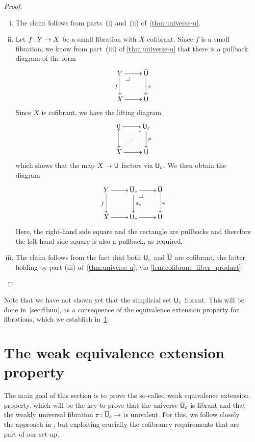 \documentclass[reqno,10pt,a4paper,oneside,draft]{amsart}
\begin{document}
\begin{proof} \hfill
\begin{enumerate}[(i)] 
\item The claim follows from parts~(i) and~(ii) of~\cref{thm:universe-u}. 
\item Let $f \colon Y \to X$ be a small fibration with $X$ cofibrant. Since $f$ is a
small fibration, we know 
from part~(iii) of \cref{thm:universe-u} that there is a pullback diagram of the form 
\[
\xymatrix{
Y \ar[r] \ar[d]_f \drpullback & \UU \ar[d]^{\pi} \\
X \ar[r] & \U }
\]
Since $X$ is cofibrant, we have the lifting diagram
\[
\xymatrix{
0 \ar[r] \ar@{>->}[d] & \U_c \ar[d]^{p} \\
X \ar[r] \ar@{.>}[ur] & \U }
\]
which shows that the map $X \to \mathsf{U}$ factors via $\mathsf{U}_c$.  We then obtain the diagram
\[
\xymatrix{
Y \ar[r] \ar[d]_f &  \UU_c \ar[r]  \ar[d]^{\pi_c} \drpullback & \UU \ar[d]^{\pi} \\
X \ar[r] & \U_c \ar[r] &  \U }
\]
Here, the right-hand side square and the rectangle are pullbacks and therefore the left-hand
side square is also a pullback, as required. 
\item The claim follows from the fact that both $\mathsf{U}_c$ and
$\overline{\mathsf{U}}$ are cofibrant, the latter holding by part (iii) of~\cref{thm:universe-u}, via \cref{lem:cofibrant_fiber_product}. \qedhere
\end{enumerate} 
\end{proof} 





Note that we have not shown yet that the simplicial set $\mathsf{U}_c$ fibrant. This will be done in~\cref{sec:fibuu}, as a consequence of the equivalence extension property for fibrations, which we establish in~\cref{sec:equep}.

\newpage


\section{The weak equivalence extension property}
\label{sec:equep}

The main goal of this section is to prove the so-called weak equivalence extension property, which will be the key to prove that the universe $\overline{\mathsf{U}}_c$ is fibrant and that the weakly universal fibration $\pi \colon \overline{\mathsf{U}}_c \to $ is univalent.  For this, we follow closely the approach in \cite{voevodsky-simplicial-model}, but exploiting crucially the cofibrancy requirements that are part of our set-up.
\end{document}
